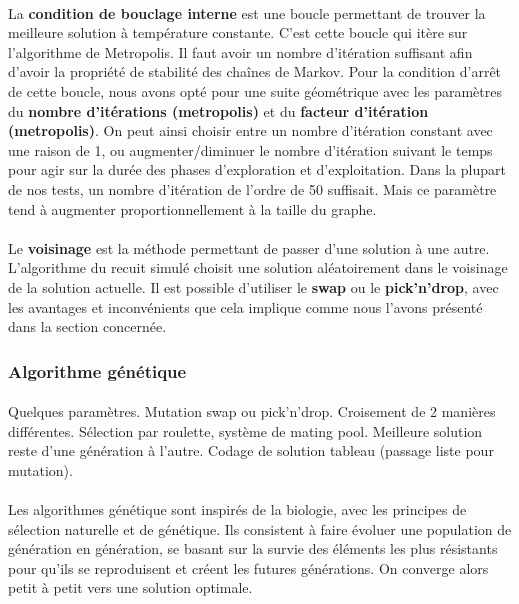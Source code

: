\documentclass[12pt]{article}
\begin{document}
\paragraph{}La \textbf{condition de bouclage interne} est une boucle permettant de trouver la meilleure solution à température constante. C'est cette boucle qui itère sur l'algorithme de Metropolis. Il faut avoir un nombre d'itération suffisant afin d'avoir la propriété de stabilité des chaînes de Markov. Pour la condition d'arrêt de cette boucle, nous avons opté pour une suite géométrique avec les paramètres du \textbf{nombre d'itérations (metropolis)} et du \textbf{facteur d'itération (metropolis)}. On peut ainsi choisir entre un nombre  d'itération constant avec une raison de 1, ou augmenter/diminuer le nombre d'itération suivant le temps pour agir sur la durée des phases d'exploration et d'exploitation. Dans la plupart de nos tests, un nombre d'itération de l'ordre de 50 suffisait. Mais ce paramètre tend à augmenter proportionnellement à la taille du graphe.

\paragraph{}Le \textbf{voisinage} est la méthode permettant de passer d'une solution à une autre. L'algorithme du recuit simulé choisit une solution aléatoirement dans le voisinage de la solution actuelle. Il est possible d'utiliser le \textbf{swap} ou le \textbf{pick'n'drop}, avec les avantages et inconvénients que cela implique comme nous l'avons présenté dans la section concernée.

\subsubsection{Algorithme génétique}

\paragraph{}Quelques paramètres. Mutation swap ou pick'n'drop. Croisement de 2 manières différentes. Sélection par roulette, système de mating pool. Meilleure solution reste d'une génération à l'autre. Codage de solution tableau (passage liste pour mutation).

\paragraph{}Les algorithmes génétique sont inspirés de la biologie, avec les principes de sélection naturelle et de génétique. Ils consistent à faire évoluer une population de génération en génération, se basant sur la survie des éléments les plus résistants pour qu'ils se reproduisent et créent les futures générations. On converge alors petit à petit vers une solution optimale.
\end{document}
